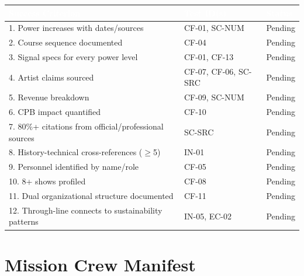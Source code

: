 \documentclass[11pt,letterpaper]{article}
\newcommand{\tableheader}[1]{\textbf{\sffamily\textcolor{white}{#1}}}
\begin{document}
\begin{center}
\begin{tabularx}{\textwidth}{XL{3.5cm}C{1.5cm}}
\toprule
{}
\tableheader{Success Criterion} & \tableheader{Test ID(s)} & \tableheader{Status} \\
. Power increases with dates/sources & CF-01, SC-NUM & Pending \\
2. Course sequence documented & CF-04 & Pending \\
3. Signal specs for every power level & CF-01, CF-13 & Pending \\
4. Artist claims sourced & CF-07, CF-06, SC-SRC & Pending \\
5. Revenue breakdown & CF-09, SC-NUM & Pending \\
6. CPB impact quantified & CF-10 & Pending \\
7. 80\%+ citations from official/professional sources & SC-SRC & Pending \\
8. History-technical cross-references ($\geq$5) & IN-01 & Pending \\
9. Personnel identified by name/role & CF-05 & Pending \\
10. 8+ shows profiled & CF-08 & Pending \\
11. Dual organizational structure documented & CF-11 & Pending \\
12. Through-line connects to sustainability patterns & IN-05, EC-02 & Pending \\
\bottomrule
\end{tabularx}
\end{center}

\section{Mission Crew Manifest}
\end{document}
